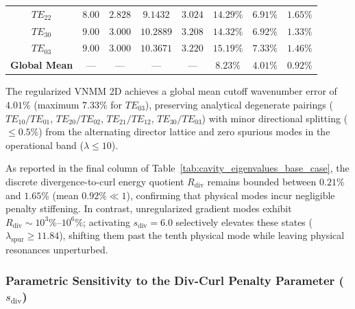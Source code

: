\documentclass[preprint,12pt]{elsarticle}
\begin{document}
\begin{table}[!htbp]
{\begin{tabular}{@{} c c c c c c c c @{}}
            $TE_{22}$                 & $8.00$                          & $2.828$                      & $9.1432$                  & $3.024$                & $14.29\%$                     & $\mathbf{6.91\%}$         & $1.65\%$                \\
            $TE_{30}$                 & $9.00$                          & $3.000$                      & $10.2889$                 & $3.208$                & $14.32\%$                     & $\mathbf{6.92\%}$         & $1.33\%$                \\
            $TE_{03}$                 & $9.00$                          & $3.000$                      & $10.3671$                 & $3.220$                & $15.19\%$                     & $\mathbf{7.33\%}$         & $1.46\%$                \\
            \midrule
            \textbf{Global Mean}      & ---                             & ---                          & ---                       & ---                    & $\mathbf{8.23\%}$             & $\mathbf{4.01\%}$         & $\mathbf{0.92\%}$       \\
            \bottomrule
        \end{tabular}%
    }
\end{table}

The regularized VNMM 2D achieves a global mean cutoff wavenumber error of $4.01\%$ (maximum $7.33\%$ for $TE_{03}$), preserving analytical degenerate pairings ($TE_{10}/TE_{01}$, $TE_{20}/TE_{02}$, $TE_{21}/TE_{12}$, $TE_{30}/TE_{03}$) with minor directional splitting ($\le 0.5\%$) from the alternating director lattice and zero spurious modes in the operational band ($\lambda \le 10$).

As reported in the final column of Table~\ref{tab:cavity_eigenvalues_base_case}, the discrete divergence-to-curl energy quotient $R_{\mathrm{div}}$ remains bounded between $0.21\%$ and $1.65\%$ (mean $0.92\% \ll 1$), confirming that physical modes incur negligible penalty stiffening. In contrast, unregularized gradient modes exhibit $R_{\mathrm{div}} \sim 10^3\%\text{--}10^6\%$; activating $s_{\mathrm{div}} = 6.0$ selectively elevates these states ($\lambda_{\mathrm{spur}} \ge 11.84$), shifting them past the tenth physical mode while leaving physical resonances unperturbed.

\subsubsection{Parametric Sensitivity to the Div-Curl Penalty Parameter (\texorpdfstring{$s_{\mathrm{div}}$}{s(div)})}
\label{subsubsec:s_div_sensitivity}
\end{document}
